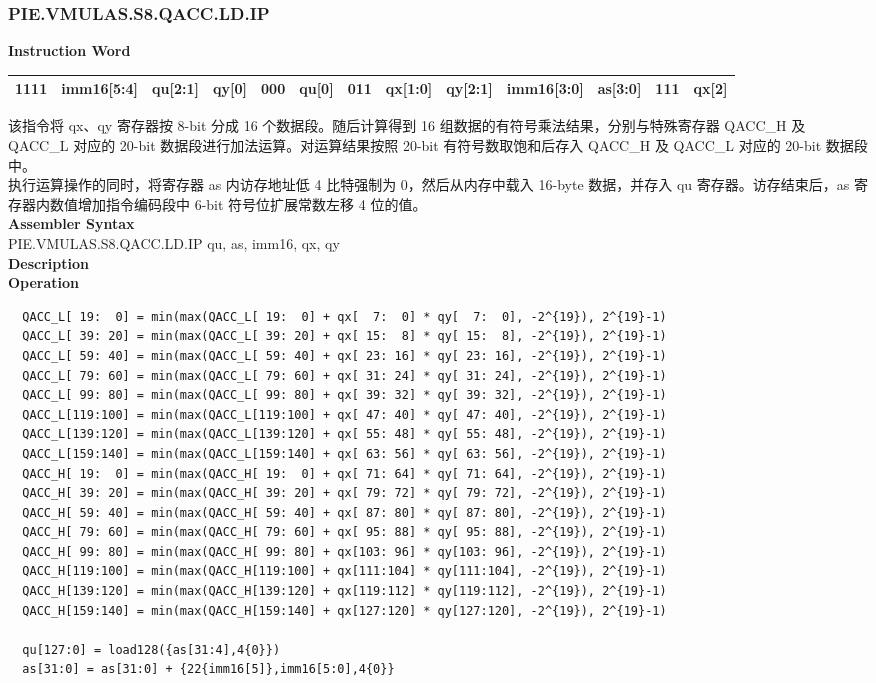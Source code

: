 \subsubsection{PIE.VMULAS.S8.QACC.LD.IP}\label{instruction:PIEVMULASS8QACCLDIP}
\setlength\tabcolsep{6pt}
\textbf{Instruction Word} \\
\begin{tabular}{|c|c|c|c|c|c|c|c|c|c|c|c|c|}
	\hline
	1111 & imm16[5:4] & qu[2:1] & qy[0] & 000 & qu[0] & 011 & qx[1:0] & qy[2:1] & imm16[3:0] & as[3:0] & 111 & qx[2] \\
	\hline
\end{tabular}
该指令将 qx、qy 寄存器按 8-bit 分成 16 个数据段。随后计算得到 16 组数据的有符号乘法结果，分别与特殊寄存器 QACC\_H 及 QACC\_L 对应的 20-bit 数据段进行加法运算。对运算结果按照 20-bit 有符号数取饱和后存入 QACC\_H 及 QACC\_L 对应的 20-bit 数据段中。\\
执行运算操作的同时，将寄存器 as 内访存地址低 4 比特强制为 0，然后从内存中载入 16-byte 数据，并存入 qu 寄存器。访存结束后，as 寄存器内数值增加指令编码段中 6-bit 符号位扩展常数左移 4 位的值。\\
\textbf{Assembler Syntax} \\
PIE.VMULAS.S8.QACC.LD.IP qu, as, imm16, qx, qy \\
\textbf{Description} \\
\textbf{Operation}
\begin{lstlisting}
  QACC_L[ 19:  0] = min(max(QACC_L[ 19:  0] + qx[  7:  0] * qy[  7:  0], -2^{19}), 2^{19}-1)
  QACC_L[ 39: 20] = min(max(QACC_L[ 39: 20] + qx[ 15:  8] * qy[ 15:  8], -2^{19}), 2^{19}-1)
  QACC_L[ 59: 40] = min(max(QACC_L[ 59: 40] + qx[ 23: 16] * qy[ 23: 16], -2^{19}), 2^{19}-1)
  QACC_L[ 79: 60] = min(max(QACC_L[ 79: 60] + qx[ 31: 24] * qy[ 31: 24], -2^{19}), 2^{19}-1)
  QACC_L[ 99: 80] = min(max(QACC_L[ 99: 80] + qx[ 39: 32] * qy[ 39: 32], -2^{19}), 2^{19}-1)
  QACC_L[119:100] = min(max(QACC_L[119:100] + qx[ 47: 40] * qy[ 47: 40], -2^{19}), 2^{19}-1)
  QACC_L[139:120] = min(max(QACC_L[139:120] + qx[ 55: 48] * qy[ 55: 48], -2^{19}), 2^{19}-1)
  QACC_L[159:140] = min(max(QACC_L[159:140] + qx[ 63: 56] * qy[ 63: 56], -2^{19}), 2^{19}-1)
  QACC_H[ 19:  0] = min(max(QACC_H[ 19:  0] + qx[ 71: 64] * qy[ 71: 64], -2^{19}), 2^{19}-1)
  QACC_H[ 39: 20] = min(max(QACC_H[ 39: 20] + qx[ 79: 72] * qy[ 79: 72], -2^{19}), 2^{19}-1)
  QACC_H[ 59: 40] = min(max(QACC_H[ 59: 40] + qx[ 87: 80] * qy[ 87: 80], -2^{19}), 2^{19}-1)
  QACC_H[ 79: 60] = min(max(QACC_H[ 79: 60] + qx[ 95: 88] * qy[ 95: 88], -2^{19}), 2^{19}-1)
  QACC_H[ 99: 80] = min(max(QACC_H[ 99: 80] + qx[103: 96] * qy[103: 96], -2^{19}), 2^{19}-1)
  QACC_H[119:100] = min(max(QACC_H[119:100] + qx[111:104] * qy[111:104], -2^{19}), 2^{19}-1)
  QACC_H[139:120] = min(max(QACC_H[139:120] + qx[119:112] * qy[119:112], -2^{19}), 2^{19}-1)
  QACC_H[159:140] = min(max(QACC_H[159:140] + qx[127:120] * qy[127:120], -2^{19}), 2^{19}-1)

  qu[127:0] = load128({as[31:4],4{0}})
  as[31:0] = as[31:0] + {22{imm16[5]},imm16[5:0],4{0}}
\end{lstlisting}

